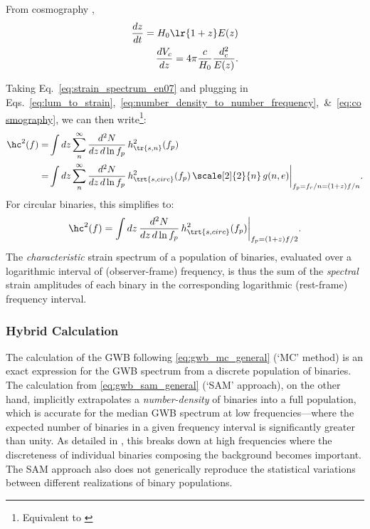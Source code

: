 \documentclass[10pt, oneside, onecolumn]{article}   	%
\newcommand{\hsn}{h_\tr{s,n}}
\newcommand{\hscirc}{h_\trt{s,circ}}
\begin{document}
                From cosmography \citep[e.g.][]{Hogg1999},
                \begin{subequations}
                \label{eq:cosmography}
                \begin{align}
                    \frac{dz}{dt} = H_0 \lr{1+z} E(z) \\
                    \frac{d V_c}{dz} = 4\pi \frac{c}{H_0} \frac{d_c^2}{E(z)}.
                \end{align}
                \end{subequations}

                Taking Eq.~\ref{eq:strain_spectrum_en07} and plugging in Eqs.~\ref{eq:lum_to_strain},~\ref{eq:number_density_to_number_frequency},~\&~\ref{eq:cosmography}, we can then write\footnote{Equivalent to \citet[][Eq.~10]{sesana2008}}:
                \begin{subequations}
                \label{eq:gwb_mc_general}
                \begin{align}
                    \hc^2(f) = & \int dz \sum_n^\infty \frac{d^2 N}{dz \, d\ln f_p} \, \hsn^2(f_p) \\
                        = & \int dz \sum_n^\infty \frac{d^2 N}{dz \, d\ln f_p} \, \hscirc^2(f_p) \, \scale[2]{2}{n} \, g(n,e) \bigg|_{f_p = f_r / n = (1+z) f / n}.
                \end{align}
                \end{subequations}
                For circular binaries, this simplifies to:
                \begin{equation}
                    \hc^2(f) = \int dz \, \frac{d^2 N}{dz \, d\ln f_p} \, \hscirc^2(f_p) \bigg|_{f_p = (1+z) f / 2}.
                \end{equation}
                The \textit{characteristic} strain spectrum of a population of binaries, evaluated over a logarithmic interval of (observer-frame) frequency, is thus the sum of the \textit{spectral} strain amplitudes of each binary in the corresponding logarithmic (rest-frame) frequency interval.


            \subsubsection{Hybrid Calculation}

                The calculation of the GWB following \eqref{eq:gwb_mc_general} (`MC' method) is an exact expression for the GWB spectrum from a discrete population of binaries.  The calculation from \eqref{eq:gwb_sam_general} (`SAM' approach), on the other hand, implicitly extrapolates a \textit{number-density} of binaries into a full population, which is accurate for the median GWB spectrum at low frequencies---where the expected number of binaries in a given frequency interval is significantly greater than unity.  As detailed in \citet[][particularly \textsection~4]{sesana2008}, this breaks down at high frequencies where the discreteness of individual binaries composing the background becomes important.  The SAM approach also does not generically reproduce the statistical variations between different realizations of binary populations. \\
\end{document}
